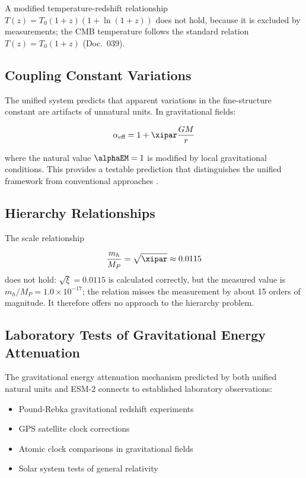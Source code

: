 	A modified temperature-redshift relationship $T(z) = T_0(1+z)(1+\ln(1+z))$ does not hold, because it is excluded by measurements; the CMB temperature follows the standard relation $T(z) = T_0(1+z)$ (Doc.~039).
	
	\subsection{Coupling Constant Variations}
	\label{subsec:coupling_variations}
	
	The unified system predicts that apparent variations in the fine-structure constant are artifacts of unnatural units. In gravitational fields:
	
	\begin{equation}
		\alpha_{\text{eff}} = 1 + \xipar \frac{GM}{r}
	\end{equation}
	
	where the natural value $\alphaEM = 1$ is modified by local gravitational conditions. This provides a testable prediction that distinguishes the unified framework from conventional approaches \cite{Will2014,Webb2001}.
	
	\subsection{Hierarchy Relationships}
	\label{subsec:hierarchy_relationships}
	
	The scale relationship
	
	\begin{equation}
		\frac{m_h}{M_P} = \sqrt{\xipar} \approx 0.0115
	\end{equation}
	does not hold: $\sqrt{\xi} = 0.0115$ is calculated correctly, but the measured value is $m_h/M_P = 1.0\times10^{-17}$; the relation misses the measurement by about 15 orders of magnitude. It therefore offers no approach to the hierarchy problem.

	\subsection{Laboratory Tests of Gravitational Energy Attenuation}
	\label{subsec:laboratory_tests}
	
	The gravitational energy attenuation mechanism predicted by both unified natural units and ESM-2 connects to established laboratory observations:
	
	\begin{itemize}
		\item Pound-Rebka gravitational redshift experiments \cite{Pound1960}
		\item GPS satellite clock corrections \cite{Ashby2003}
		\item Atomic clock comparisons in gravitational fields \cite{Ludlow2015}
		\item Solar system tests of general relativity \cite{Bertotti2003}
	\end{itemize}
	
